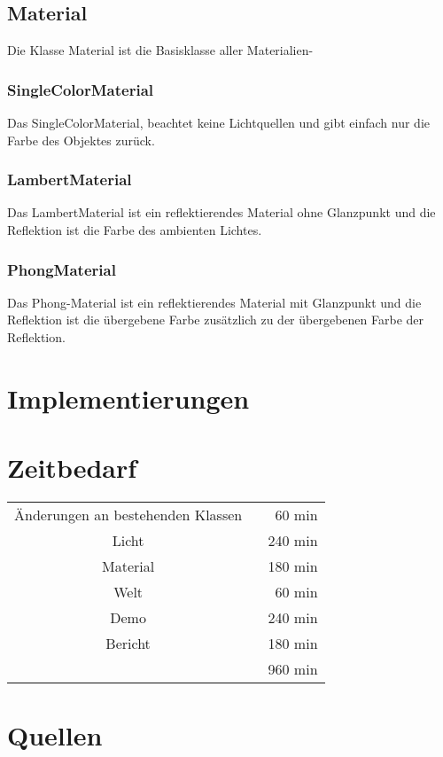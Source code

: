 \documentclass[14pt]{extarticle}
\begin{document}
\subsection{Material}
Die Klasse Material ist die Basisklasse aller Materialien-
\subsubsection{SingleColorMaterial}
Das SingleColorMaterial, beachtet keine Lichtquellen und gibt einfach nur die Farbe des Objektes zurück.
\subsubsection{LambertMaterial}
Das LambertMaterial ist ein reflektierendes Material ohne Glanzpunkt und die Reflektion ist die Farbe des ambienten Lichtes.
\subsubsection{PhongMaterial}
Das Phong-Material ist ein reflektierendes Material mit Glanzpunkt und die Reflektion ist die übergebene Farbe zusätzlich zu der übergebenen Farbe der Reflektion.
\section{Implementierungen}

\section{Zeitbedarf}
\begin{center}
\begin{tabular}{cr}
Änderungen an bestehenden Klassen \	&60 min	\\
Licht	  \	&240 min	\\
Material 	\	&180 min	\\
Welt \	&60 min	\\
Demo \	&240 min	\\
Bericht  \		&180 min	 \\
	\hline
	&960 min
\end{tabular}
\end{center}

\section{Quellen}
\end{document}
